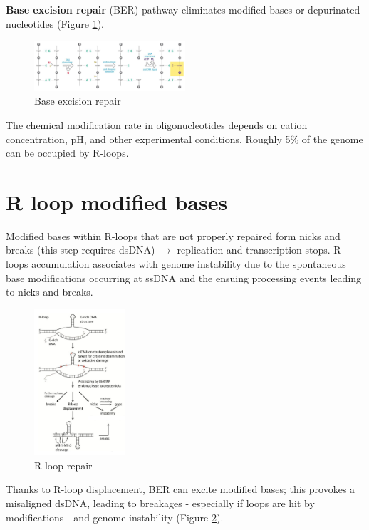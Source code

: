 \textbf{Base excision repair} (BER) pathway eliminates modified bases or depurinated nucleotides (Figure \ref{fig:ber}).

\begin{figure}
\centering
\includegraphics[width=0.5\textwidth]{../_resources/Screen_Shot_2022-11-30_at_08-49-05.png}
\caption{Base excision repair}
\label{fig:ber}
\end{figure}

The chemical modification rate in oligonucleotides depends on cation concentration, pH, and other experimental conditions. Roughly 5\% of the genome can be occupied by R-loops.

\hypertarget{r-loop-modified-bases}{%
\section{R loop modified bases}\label{r-loop-modified-bases}}

Modified bases within R-loops that are not properly repaired form nicks and breaks (this step requires dsDNA) $\rightarrow$ replication and transcription stops. R-loops accumulation associates with genome instability due to the spontaneous base modifications occurring at ssDNA and the ensuing processing events leading to nicks and breaks.

\begin{figure}
\centering
\includegraphics[width=0.3\textwidth]{../_resources/Screen_Shot_2022-11-30_at_08-51-07.png}
\caption{R loop repair}
\label{fig:rrep}
\end{figure}

Thanks to R-loop displacement, BER can excite modified bases; this provokes a misaligned dsDNA, leading to breakages - especially if loops are hit by modifications - and genome instability (Figure \ref{fig:rrep}).


